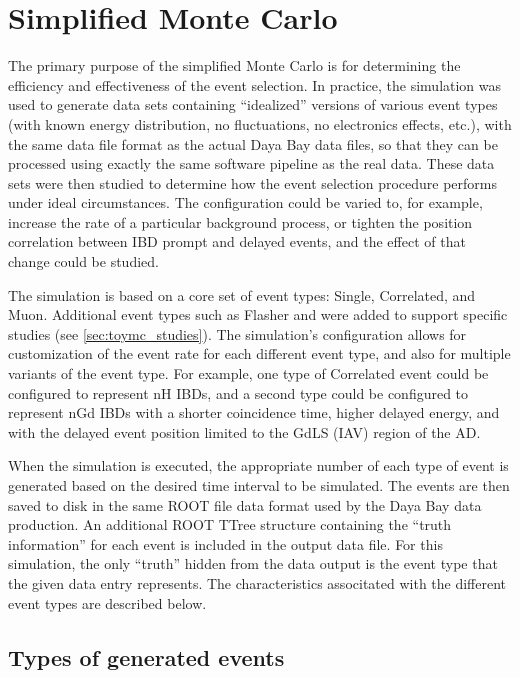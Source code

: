 \section{Simplified Monte Carlo}
\label{sec:toymc}

The primary purpose of the simplified Monte Carlo
is for determining the efficiency and effectiveness of the event selection.
In practice, the simulation was used to generate data sets
containing ``idealized'' versions of various event types
(with known energy distribution, no fluctuations, no electronics effects, etc.),
with the same data file format as the actual Daya Bay data files,
so that they can be processed using exactly the same software pipeline
as the real data.
These data sets were then studied to determine how the event selection procedure
performs under ideal circumstances.
The configuration could be varied to, for example,
increase the rate of a particular background process,
or tighten the position correlation between IBD prompt and delayed events,
and the effect of that change could be studied.

The simulation is based on a core set of event types:
Single, Correlated, and Muon.
Additional event types such as Flasher and \li{} were added to support specific studies
(see \cref{sec:toymc_studies}).
The simulation's configuration allows for customization of the event rate
for each different event type,
and also for multiple variants of the event type.
For example, one type of Correlated event could be configured to represent nH IBDs,
and a second type could be configured to represent nGd IBDs
with a shorter coincidence time, higher delayed energy,
and with the delayed event position limited to the GdLS (IAV) region of the AD.

When the simulation is executed,
the appropriate number of each type of event is generated
based on the desired time interval to be simulated.
The events are then saved to disk in the same ROOT file data format
used by the Daya Bay data production.
An additional ROOT TTree structure containing the ``truth information''
for each event is included in the output data file.
For this simulation, the only ``truth'' hidden from the data output
is the event type that the given data entry represents.
The characteristics associtated with the different event types
are described below.

\subsection{Types of generated events}


